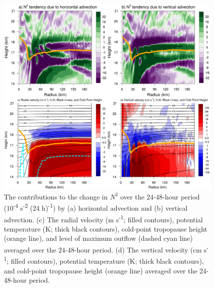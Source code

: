 \begin{figure}[ht]
\centerline{\includegraphics[width=39pc]{figures/h024-h048-adv.png}}
\caption{The contributions to the change in $N^2$ over the 24-48-hour period (10\textsuperscript{-4} s\textsuperscript{-2} (24 h)\textsuperscript{-1}) by (a) horizontal advection and (b) vertical advection. (c) The radial velocity (m s\textsuperscript{-1}; filled contours), potential temperature (K; thick black contours), cold-point tropopause height (orange line), and level of maximum outflow (dashed cyan line) averaged over the 24-48-hour period. (d) The vertical velocity (cm s\textsuperscript{-1}; filled contours), potential temperature (K; thick black contours), and cold-point tropopause height (orange line) averaged over the 24-48-hour period.}
\label{fig:adv-24-48}
\end{figure}



